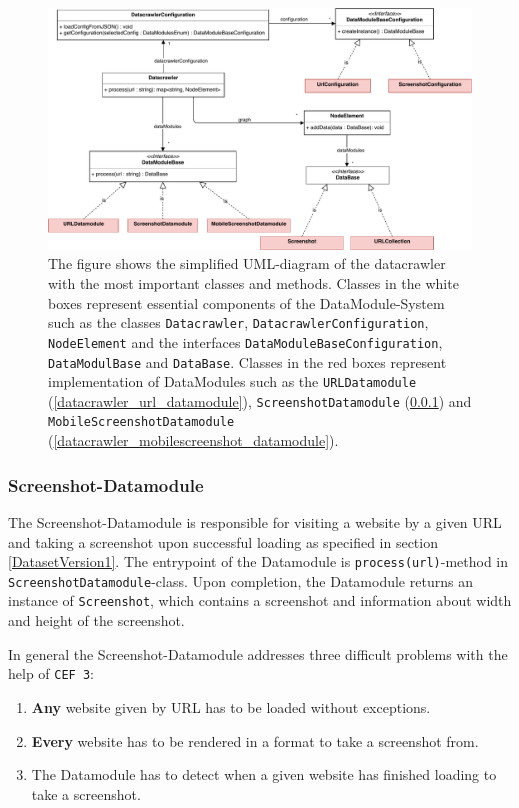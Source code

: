 \begin{figure}
	\centering
	 \includegraphics[scale=0.65]{resources/datacrawler_uml_diagram}
	 \caption{The figure shows the simplified UML-diagram of the datacrawler with the most important classes and methods. Classes in the white boxes represent essential components of the DataModule-System such as the classes \texttt{Datacrawler}, \texttt{DatacrawlerConfiguration}, \texttt{NodeElement} and the interfaces \texttt{DataModuleBaseConfiguration}, \texttt{DataModulBase} and \texttt{DataBase}. Classes in the red boxes represent implementation of DataModules such as the \texttt{URLDatamodule} (\ref{datacrawler_url_datamodule}), \texttt{ScreenshotDatamodule} (\ref{datacrawler_screenshot_datamodule}) and \texttt{MobileScreenshotDatamodule} (\ref{datacrawler_mobilescreenshot_datamodule}).}
	\label{datacrawler_uml_diagram}
\end{figure}

\subsubsection{Screenshot-Datamodule}
\label{datacrawler_screenshot_datamodule}
The Screenshot-Datamodule is responsible for visiting a website by a given URL and taking a screenshot upon successful loading as specified in section \ref{DatasetVersion1}. The entrypoint of the Datamodule is \texttt{process(url)}-method in \texttt{ScreenshotDatamodule}-class. Upon completion, the Datamodule returns an instance of \texttt{Screenshot}, which contains a screenshot and information about width and height of the screenshot.

In general the Screenshot-Datamodule addresses three difficult problems with the help of \texttt{CEF 3}: 

\begin{enumerate}
	\item \textbf{Any} website given by URL  has to be loaded without exceptions.
	\item \textbf{Every} website has to be rendered in a format to take a screenshot from.
	\item The Datamodule has to detect when a given website has finished loading to take a screenshot.
\end{enumerate}


